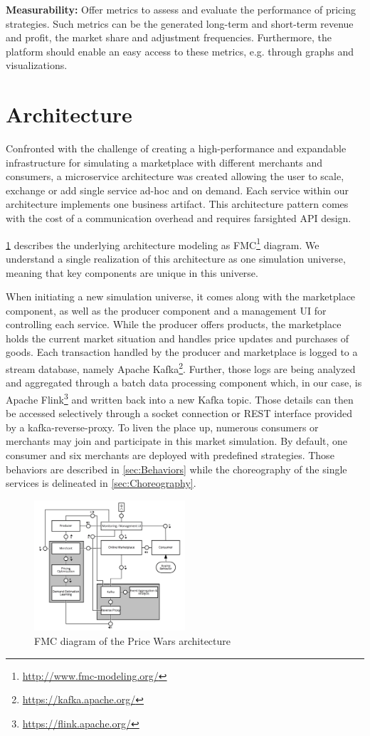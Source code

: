 \begin{description}
\item\textbf{Measurability:} Offer metrics to assess and evaluate the performance of pricing strategies. Such metrics can be the generated long-term and short-term revenue and profit, the market share and adjustment frequencies. Furthermore, the platform should enable an easy access to these metrics, e.g. through graphs and visualizations.

\end{description}


\section{Architecture}
\label{sec:Architecture}
%
Confronted with the challenge of creating a high-performance and expandable infrastructure for simulating a marketplace with different merchants and consumers, a microservice architecture was created allowing the user to scale, exchange or add single service ad-hoc and on demand. Each service within our architecture implements one business artifact. This architecture pattern comes with the cost of a communication overhead and requires farsighted API design.

\cref{fig:fmc} describes the underlying architecture modeling as FMC\footnote{\url{http://www.fmc-modeling.org/}} diagram. We understand a single realization of this architecture as one simulation universe, meaning that key components are unique in this universe. 

When initiating a new simulation universe, it comes along with the marketplace component, as well as the producer component and a management UI for controlling each service. While the producer offers products, the marketplace holds the current market situation and handles price updates and purchases of goods. Each transaction handled by the producer and marketplace is logged to a stream database, namely Apache Kafka\footnote{\url{https://kafka.apache.org/}}. Further, those logs are being analyzed and aggregated through a batch data processing component which, in our case, is Apache Flink\footnote{\url{https://flink.apache.org/}} and written back into a new Kafka topic. Those details can then be accessed selectively through a socket connection or REST interface provided by a kafka-reverse-proxy. 
To liven the place up, numerous consumers or merchants may join and participate in this market simulation. By default, one consumer and six merchants are deployed with predefined strategies. Those behaviors are described in \cref{sec:Behaviors} while the choreography of the single services is delineated in \cref{sec:Choreography}.

%
\begin{figure}[h]
    \centering
    \includegraphics[width=0.5\textwidth]{images/architecture.png}
    \caption{FMC diagram of the Price Wars architecture}
    \label{fig:fmc}
\end{figure}
%